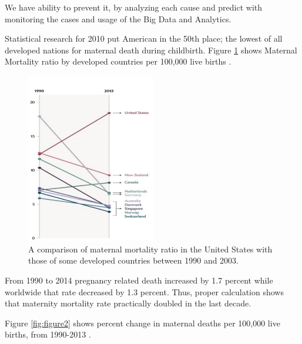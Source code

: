 \documentclass[sigconf]{acmart}
\begin{document}
We have ability to prevent it, by analyzing each cause and predict with monitoring the cases and usage of the Big Data and Analytics. 

Statistical research for 2010 put American in the 50th place; the lowest of all developed nations for maternal death during childbirth\cite{bingham2011maternal}. Figure \ref{fig:figure1} shows Maternal Mortality ratio by developed countries per 100,000 live births \cite{maron2015has}.

\begin{figure}
  \centering
  \includegraphics[width=0.5\textwidth]{images/figure1.pdf}
  \caption{A comparison of maternal mortality ratio in the United States with those of some developed countries between 1990 and 2003.} \label{fig:figure1} 
\end{figure}

From 1990 to 2014 pregnancy related death increased by 1.7 percent while worldwide that rate decreased by 1.3 percent. Thus, proper calculation shows that maternity mortality rate practically doubled in the last decade.

Figure \ref{fig:figure2} shows percent change in maternal deaths per 100,000 live births, from 1990-2013 \cite{kassebaum2016global}.
\end{document}
